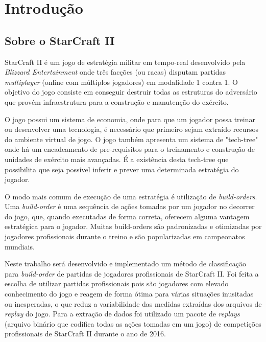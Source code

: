 \tableofcontents*
\cleardoublepage

\textual
	\chapter{Introdução}
		\section{Sobre o StarCraft II}

StarCraft II é um jogo de estratégia militar em tempo-real desenvolvido pela \textit{Blizzard Entertainment} onde três facções (ou \glspl{raca}) disputam partidas \textit{multiplayer} (online com múltiplos jogadores) em modalidade 1 contra 1. O objetivo do jogo consiste em conseguir destruir todas as \glspl{estrutura} do adversário que provém infraestrutura para a construção e manutenção do exército.

O jogo possui um sistema de economia, onde para que um jogador possa treinar ou desenvolver uma tecnologia, é necessário que primeiro sejam extraído \glspl{recurso} do ambiente virtual de jogo. O jogo também apresenta um sistema de "\gls{tech-tree}" onde há um encadeamento de pre-requisitos para o treinamento e construção de \glspl{unidade} de exército mais avançadas. É a existência desta \gls{tech-tree} que possibilita que seja possível inferir e prever uma determinada estratégia do jogador. 

O modo mais comum de execução de uma estratégia é utilização de \textit{\glspl{build-order}}. Uma \textit{\gls{build-order}} é uma sequência de ações tomadas por um jogador no decorrer do jogo, que, quando executadas de forma correta, oferecem alguma vantagem estratégica para o jogador. Muitas \glspl{build-order} são padronizadas e otimizadas por jogadores profissionais durante o treino e são popularizadas em campeonatos mundiais.

Neste trabalho será desenvolvido e implementado um método de classificação para \textit{\gls{build-order}} de partidas de jogadores profissionais de StarCraft II. Foi feita a escolha de utilizar partidas profissionais pois são jogadores com elevado conhecimento do jogo e reagem de forma ótima para várias situações inusitadas ou inesperadas, o que reduz a variabilidade das medidas extraídas dos arquivos de \textit{\gls{replay}} do jogo. Para a extração de dados foi utilizado um pacote de \textit{\glspl{replay}} (arquivo binário que codifica todas as ações tomadas em um jogo) de competições profissionais de StarCraft II durante o ano de 2016.

